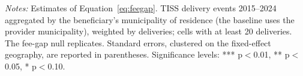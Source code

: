 
\begin{table}[H]
   \caption{\label{tab:beneficiary_muni} \textbf{Fee-gap regressions, beneficiary-municipality aggregation}}
   \centering
\small\setlength{\tabcolsep}{5pt}
   
   \par \raggedright 
   \footnotesize\textit{Notes:} Estimates of Equation~\eqref{eq:feegap}. TISS delivery events 2015--2024 aggregated by the beneficiary's municipality of residence (the baseline uses the provider municipality), weighted by deliveries; cells with at least 20 deliveries. The fee-gap null replicates. Standard errors, clustered on the fixed-effect geography, are reported in parentheses. \footnotesize Significance levels: *** p$<$0.01, ** p$<$0.05, * p$<$0.10.
\end{table}


